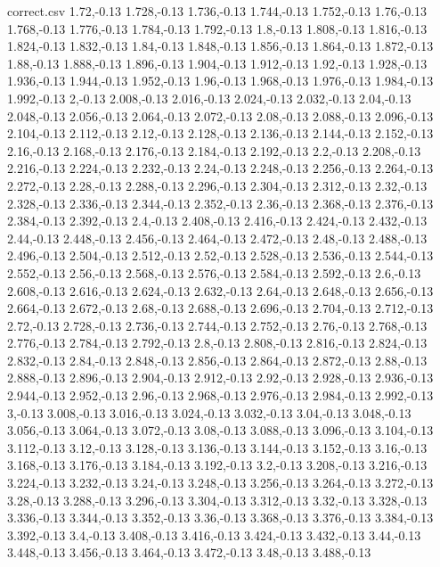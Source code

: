 \begin{filecontents*}{correct.csv}
1.72,-0.13
1.728,-0.13
1.736,-0.13
1.744,-0.13
1.752,-0.13
1.76,-0.13
1.768,-0.13
1.776,-0.13
1.784,-0.13
1.792,-0.13
1.8,-0.13
1.808,-0.13
1.816,-0.13
1.824,-0.13
1.832,-0.13
1.84,-0.13
1.848,-0.13
1.856,-0.13
1.864,-0.13
1.872,-0.13
1.88,-0.13
1.888,-0.13
1.896,-0.13
1.904,-0.13
1.912,-0.13
1.92,-0.13
1.928,-0.13
1.936,-0.13
1.944,-0.13
1.952,-0.13
1.96,-0.13
1.968,-0.13
1.976,-0.13
1.984,-0.13
1.992,-0.13
2,-0.13
2.008,-0.13
2.016,-0.13
2.024,-0.13
2.032,-0.13
2.04,-0.13
2.048,-0.13
2.056,-0.13
2.064,-0.13
2.072,-0.13
2.08,-0.13
2.088,-0.13
2.096,-0.13
2.104,-0.13
2.112,-0.13
2.12,-0.13
2.128,-0.13
2.136,-0.13
2.144,-0.13
2.152,-0.13
2.16,-0.13
2.168,-0.13
2.176,-0.13
2.184,-0.13
2.192,-0.13
2.2,-0.13
2.208,-0.13
2.216,-0.13
2.224,-0.13
2.232,-0.13
2.24,-0.13
2.248,-0.13
2.256,-0.13
2.264,-0.13
2.272,-0.13
2.28,-0.13
2.288,-0.13
2.296,-0.13
2.304,-0.13
2.312,-0.13
2.32,-0.13
2.328,-0.13
2.336,-0.13
2.344,-0.13
2.352,-0.13
2.36,-0.13
2.368,-0.13
2.376,-0.13
2.384,-0.13
2.392,-0.13
2.4,-0.13
2.408,-0.13
2.416,-0.13
2.424,-0.13
2.432,-0.13
2.44,-0.13
2.448,-0.13
2.456,-0.13
2.464,-0.13
2.472,-0.13
2.48,-0.13
2.488,-0.13
2.496,-0.13
2.504,-0.13
2.512,-0.13
2.52,-0.13
2.528,-0.13
2.536,-0.13
2.544,-0.13
2.552,-0.13
2.56,-0.13
2.568,-0.13
2.576,-0.13
2.584,-0.13
2.592,-0.13
2.6,-0.13
2.608,-0.13
2.616,-0.13
2.624,-0.13
2.632,-0.13
2.64,-0.13
2.648,-0.13
2.656,-0.13
2.664,-0.13
2.672,-0.13
2.68,-0.13
2.688,-0.13
2.696,-0.13
2.704,-0.13
2.712,-0.13
2.72,-0.13
2.728,-0.13
2.736,-0.13
2.744,-0.13
2.752,-0.13
2.76,-0.13
2.768,-0.13
2.776,-0.13
2.784,-0.13
2.792,-0.13
2.8,-0.13
2.808,-0.13
2.816,-0.13
2.824,-0.13
2.832,-0.13
2.84,-0.13
2.848,-0.13
2.856,-0.13
2.864,-0.13
2.872,-0.13
2.88,-0.13
2.888,-0.13
2.896,-0.13
2.904,-0.13
2.912,-0.13
2.92,-0.13
2.928,-0.13
2.936,-0.13
2.944,-0.13
2.952,-0.13
2.96,-0.13
2.968,-0.13
2.976,-0.13
2.984,-0.13
2.992,-0.13
3,-0.13
3.008,-0.13
3.016,-0.13
3.024,-0.13
3.032,-0.13
3.04,-0.13
3.048,-0.13
3.056,-0.13
3.064,-0.13
3.072,-0.13
3.08,-0.13
3.088,-0.13
3.096,-0.13
3.104,-0.13
3.112,-0.13
3.12,-0.13
3.128,-0.13
3.136,-0.13
3.144,-0.13
3.152,-0.13
3.16,-0.13
3.168,-0.13
3.176,-0.13
3.184,-0.13
3.192,-0.13
3.2,-0.13
3.208,-0.13
3.216,-0.13
3.224,-0.13
3.232,-0.13
3.24,-0.13
3.248,-0.13
3.256,-0.13
3.264,-0.13
3.272,-0.13
3.28,-0.13
3.288,-0.13
3.296,-0.13
3.304,-0.13
3.312,-0.13
3.32,-0.13
3.328,-0.13
3.336,-0.13
3.344,-0.13
3.352,-0.13
3.36,-0.13
3.368,-0.13
3.376,-0.13
3.384,-0.13
3.392,-0.13
3.4,-0.13
3.408,-0.13
3.416,-0.13
3.424,-0.13
3.432,-0.13
3.44,-0.13
3.448,-0.13
3.456,-0.13
3.464,-0.13
3.472,-0.13
3.48,-0.13
3.488,-0.13

\end{filecontents*}
